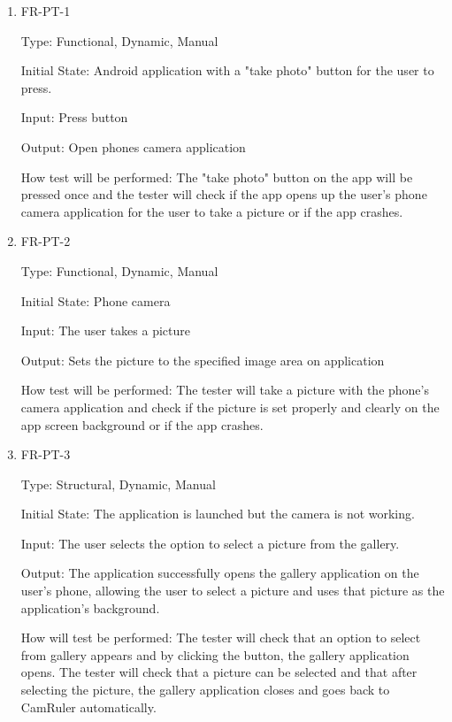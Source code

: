 \documentclass[12pt, titlepage]{article}
\begin{document}
\begin{enumerate}

\item{FR-PT-1\\}

	                Type: Functional, Dynamic, Manual
	
					Initial State: Android application with a "take photo" button for the user to press.
					
					Input: Press button
					
					Output: Open phones camera application
					
					How test will be performed: The "take photo" button on the app will be pressed once and the tester will check if the app opens up the user's phone camera application for the user to take a picture or if the app crashes.
	
						
					\item{FR-PT-2\\}
					
					Type: Functional, Dynamic, Manual
					
					Initial State: Phone camera 
					
					Input: The user takes a picture
					
					Output: Sets the picture to the specified image area on application
					
					How test will be performed: The tester will take a picture with the phone's camera application and check if the picture is set properly and clearly on the app screen background or if the app crashes. 
					
					\item{FR-PT-3\\}
					
					Type: Structural, Dynamic, Manual

                    Initial State: The application is launched but the camera is not working.

                    Input: The user selects the option to select a picture from the gallery.

                    Output: The application successfully opens the gallery application on the user's phone, allowing the user to select a picture and uses that picture as the application's background.

                    How will test be performed: The tester will check that an option to select from gallery appears and by clicking the button, the gallery application opens. The tester will check that a picture can be selected and that after selecting the picture, the gallery application closes and goes back to CamRuler automatically.
	

\end{enumerate}
\end{document}
